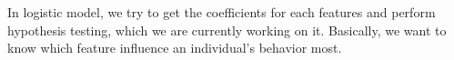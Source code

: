 \par \indent In logistic model, we try to get the coefficients for each
features and perform hypothesis testing, which we are currently working on
it. Basically, we want to know which feature influence an individual's behavior
most. 
